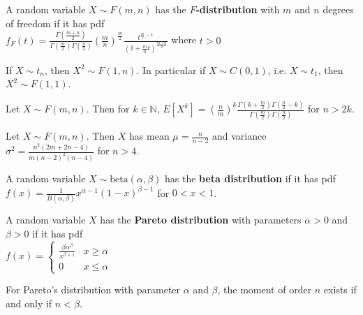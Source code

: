 \begin{defn}
    A random variable $X \sim F(m,n)$ has the \textbf{$F$-distribution} with $m$ and $n$ degrees of freedom if it has pdf \\ 
    $ f_F(t) = \displaystyle \frac{\Gamma\left(\frac{m + n}{2} \right)}{\Gamma\left(\frac{m}{2} \right) \Gamma\left(\frac{n}{2} \right)} \displaystyle \left(\frac{m}{n}\right)^{\frac{m}{2}} \frac{t^{\frac{m}{2} - 1}}{(1 + \frac{m}{n}t)^{\frac{m + n}{2}}} $ where $t > 0$
\end{defn}

\begin{prop}
    If $X \sim t_n$, then $X^2 \sim F(1,n)$. In particular if $X \sim C(0,1)$, i.e. $X \sim t_1$, then $X^2 \sim F(1,1)$.
\end{prop}

\begin{prop}
    Let $X \sim F(m,n)$. Then for $k \in \mathbb{N}$, $E[X^k] =\displaystyle \left(\frac{n}{m}\right)^k \frac{\Gamma(k + \frac{m}{2}) \Gamma(\frac{n}{2} - k)}{\Gamma(\frac{m}{2}) \Gamma(\frac{n}{2})}$ for $n > 2k$.
\end{prop}

\begin{prop}
    Let $X \sim F(m,n)$. Then $X$ has mean $\mu = \displaystyle \frac{n}{n-2}$ and variance $\sigma^2 = \displaystyle \frac{n^2 (2m + 2n - 4)}{m (n-2)^2 (n-4)}$ for $n > 4$.
\end{prop}

\begin{defn}
    A random variable $X \sim \text{beta}(\alpha, \beta)$ has the \textbf{beta distribution} if it has pdf \\
    $ f(x) = \displaystyle \frac{1}{B(\alpha, \beta)} x^{\alpha-1} (1-x)^{\beta - 1}$ for $0 < x < 1$.
\end{defn}

\begin{defn}
    A random variable $X$ has the \textbf{Pareto distribution} with parameters $\alpha > 0$ and $\beta > 0$ if it has pdf \\
    $f(x) = \begin{cases} \displaystyle \frac{\beta \alpha^\beta}{x^{\beta + 1}} & x \geq \alpha \\ 0 & x \leq \alpha \end{cases}$
\end{defn}

\begin{prop}
    For Pareto's distribution with parameter $\alpha$ and $\beta$, the moment of order $n$ exists if and only if $n < \beta$. 
\end{prop}
